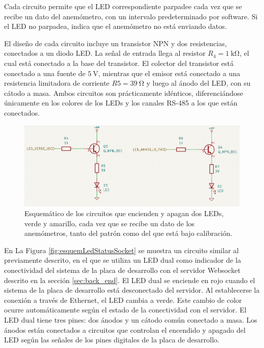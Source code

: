 Cada circuito permite que el LED correspondiente parpadee cada vez que se recibe un dato del anemómetro, con un intervalo predeterminado por software. Si el LED no parpadea, indica que el anemómetro no está enviando datos.%

El diseño de cada circuito incluye un transistor NPN y dos resistencias, conectados a un diodo LED. La señal de entrada llega al resistor $ R_4 = \SI{1}{\kilo\ohm} $, el cual está conectado a la base del transistor. El colector del transistor está conectado a una fuente de $\SI{5}{\volt} $, mientras que el emisor está conectado a una resistencia limitadora de corriente $ R5 = \SI{39}{\ohm}$ y luego al ánodo del LED, con su cátodo a masa. Ambos circuitos son prácticamente idénticos, diferenciándose únicamente en los colores de los LEDs y los canales RS-485 a los que están conectados.

\begin{figure}[H]
    \centering
    \includegraphics[width=0.95\linewidth]{Figuras/datalogger/Hardware/esquemLedsSensor.png}
    \caption{Esquemático de los circuitos que encienden y apagan dos LEDs, verde y amarillo, cada vez que se recibe un dato de los anemómetros, tanto del patrón como del que está bajo calibración.}

    \label{fig:esquemLedsSensor}
\end{figure}

En La Figura \ref{fig:esquemLedStatusSocket} se muestra un circuito similar al previamente descrito, en el que se utiliza un LED dual como indicador de la conectividad del sistema de la placa de desarrollo con el servidor Websocket descrito en la sección \ref{sec:back_end}. El LED dual se enciende en rojo cuando el sistema de la placa de desarrollo está desconectado del servidor. Al establecerse la conexión a través de Ethernet, el LED cambia a verde. Este cambio de color ocurre automáticamente según el estado de la conectividad con el servidor. El LED dual tiene tres pines: dos ánodos y un cátodo común conectado a masa. Los ánodos están conectados a circuitos que controlan el encendido y apagado del LED según las señales de los pines digitales de la placa de desarrollo.

